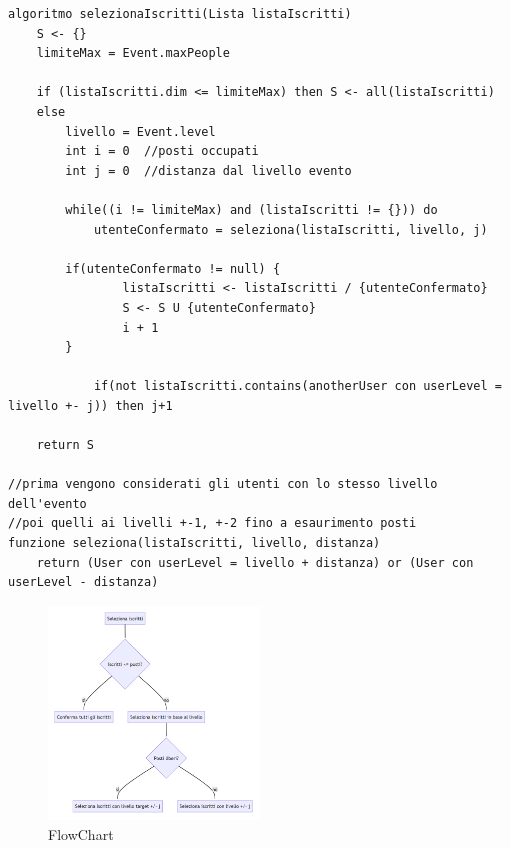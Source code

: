 \begin{lstlisting}
algoritmo selezionaIscritti(Lista listaIscritti) 
    S <- {}
    limiteMax = Event.maxPeople
    
    if (listaIscritti.dim <= limiteMax) then S <- all(listaIscritti)
    else 
        livello = Event.level
        int i = 0  //posti occupati
        int j = 0  //distanza dal livello evento
        
        while((i != limiteMax) and (listaIscritti != {})) do
            utenteConfermato = seleziona(listaIscritti, livello, j)
            
	    if(utenteConfermato != null) {
            	listaIscritti <- listaIscritti / {utenteConfermato}
            	S <- S U {utenteConfermato}
            	i + 1
	    }

            if(not listaIscritti.contains(anotherUser con userLevel = livello +- j)) then j+1
        
    return S

//prima vengono considerati gli utenti con lo stesso livello dell'evento
//poi quelli ai livelli +-1, +-2 fino a esaurimento posti
funzione seleziona(listaIscritti, livello, distanza)
    return (User con userLevel = livello + distanza) or (User con userLevel - distanza)
\end{lstlisting}

\begin{figure}[ht!]
    \centering
    \includegraphics[width = 0.5\textwidth]{Iterazione 2/images/flowchart.png}
    \caption{FlowChart}
	\label{fig:FlowChart}
\end{figure}

